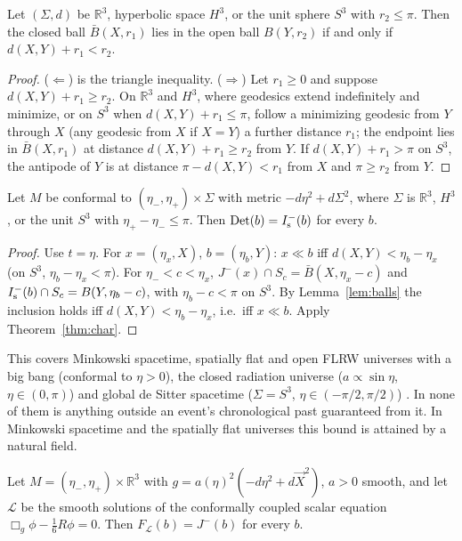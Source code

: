 \begin{lemma}\label{lem:balls}
Let $(\Sigma,d)$ be $\mathbb R^3$, hyperbolic space $H^3$, or the unit sphere
$S^3$ with $r_2\le\pi$. Then the closed ball $\bar B(X,r_1)$ lies in the open
ball $B(Y,r_2)$ if and only if $d(X,Y)+r_1<r_2$.
\end{lemma}

\begin{proof}
($\Leftarrow$) is the triangle inequality. ($\Rightarrow$) Let $r_1\ge0$ and suppose
$d(X,Y)+r_1\ge r_2$. On $\mathbb R^3$ and $H^3$, where geodesics extend
indefinitely and minimize, or on $S^3$ when $d(X,Y)+r_1\le\pi$, follow a minimizing geodesic from $Y$ through $X$ (any geodesic from
$X$ if $X=Y$) a further distance $r_1$; the endpoint lies in $\bar B(X,r_1)$ at
distance $d(X,Y)+r_1\ge r_2$ from $Y$. If $d(X,Y)+r_1>\pi$ on $S^3$, the
antipode of $Y$ is at distance $\pi-d(X,Y)<r_1$ from $X$ and $\pi\ge r_2$ from
$Y$.
\end{proof}

\begin{proposition}\label{prop:conformal}
Let $M$ be conformal to $(\eta_-,\eta_+)\times\Sigma$ with metric
$-d\eta^2+d\Sigma^2$, where $\Sigma$ is $\mathbb R^3$, $H^3$, or the unit $S^3$
with $\eta_+-\eta_-\le\pi$. Then $\mathrm{Det}(b)=I^-_{\mathrm s}(b)$ for every $b$.
\end{proposition}

\begin{proof}
Use $t=\eta$. For $x=(\eta_x,X)$, $b=(\eta_b,Y)$: $x\ll b$ iff
$d(X,Y)<\eta_b-\eta_x$ (on $S^3$, $\eta_b-\eta_x<\pi$). For $\eta_-<c<\eta_x$,
$J^-(x)\cap S_c=\bar B(X,\eta_x-c)$ and $I^-_{\mathrm s}(b)\cap S_c=B(Y,\eta_b-c)$, with
$\eta_b-c<\pi$ on $S^3$. By Lemma~\ref{lem:balls} the inclusion holds iff
$d(X,Y)<\eta_b-\eta_x$, i.e.\ iff $x\ll b$. Apply Theorem~\ref{thm:char}.
\end{proof}

This covers Minkowski spacetime, spatially flat and open FLRW universes with
a big bang (conformal to $\eta>0$), the closed radiation universe
($a\propto\sin\eta$, $\eta\in(0,\pi)$) and global de Sitter spacetime ($\Sigma=S^3$,
$\eta\in(-\pi/2,\pi/2)$) \citep{HE1973}. In none of them is anything outside an
event's chronological past guaranteed from it. In Minkowski spacetime and the
spatially flat universes this bound is attained by a natural field.

\begin{proposition}\label{prop:sharp}
Let $M=(\eta_-,\eta_+)\times\mathbb R^3$ with $g=a(\eta)^2(-d\eta^2+d\vec X^2)$,
$a>0$ smooth, and let $\mathcal L$ be the smooth solutions of the conformally
coupled scalar equation $\Box_g\phi-\tfrac16R\phi=0$. Then
$F_{\mathcal L}(b)=J^-(b)$ for every $b$.
\end{proposition}

